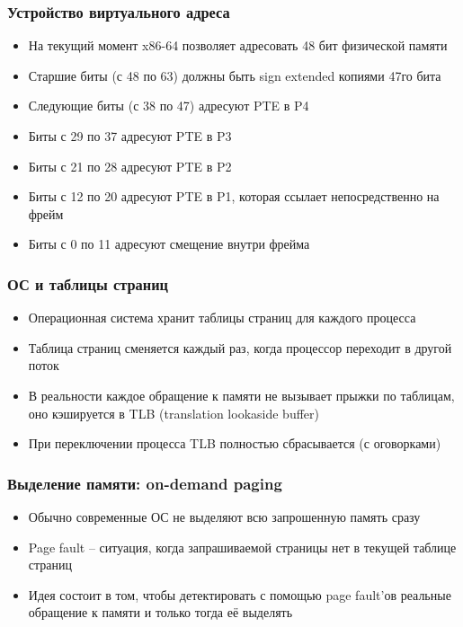   \subsubsection{Устройство виртуального адреса}
    \begin{itemize}
      \item На текущий момент x86-64 позволяет адресовать 48 бит физической памяти
      \item Старшие биты (с 48 по 63) должны быть sign extended копиями 47го бита
      \item Следующие биты (с 38 по 47) адресуют PTE в P4
      \item Биты с 29 по 37 адресуют PTE в P3
      \item Биты с 21 по 28 адресуют PTE в P2
      \item Биты с 12 по 20 адресуют PTE в P1, которая ссылает непосредственно на фрейм
      \item Биты с 0 по 11 адресуют смещение внутри фрейма
    \end{itemize}
  
    \subsubsection{ОС и таблицы страниц}
      \begin{itemize}
        \item Операционная система хранит таблицы страниц для каждого процесса
        \item Таблица страниц сменяется каждый раз, когда процессор переходит в другой поток
        \item В реальности каждое обращение к памяти не вызывает прыжки по таблицам, оно кэшируется в TLB (translation lookaside buffer)
        \item При переключении процесса TLB полностью сбрасывается (с оговорками)
      \end{itemize}
    
    \subsubsection{Выделение памяти: on-demand paging}
      \begin{itemize}
        \item Обычно современные ОС не выделяют всю запрошенную память сразу
        \item Page fault -- ситуация, когда запрашиваемой страницы нет в текущей таблице страниц
        \item Идея состоит в том, чтобы детектировать с помощью page fault'ов реальные обращение к памяти и только тогда её выделять
      \end{itemize}
    
